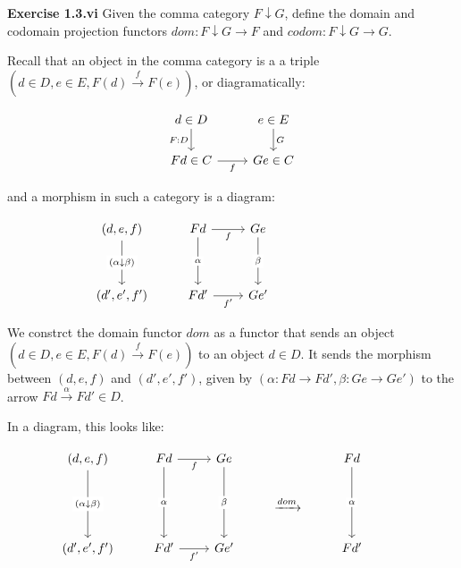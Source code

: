 \documentclass[11pt]{book}
\newcommand{\question}[1]{\textbf{#1}}
\newcommand{\comma}{\downarrow}
\begin{document}
\question{Exercise 1.3.vi} Given the comma category $F \downarrow G$, define the domain and codomain projection functors $dom: F \comma G \rightarrow F$
  and $codom: F \comma G \rightarrow G$.


Recall that an object in the comma category is a a triple $(d \in D, e \in E, F(d) \xrightarrow{f} F(e))$, or diagramatically:

\[\begin{tikzcd}
	{d \in D} & {e \in E} \\
	{Fd\in C} & {Ge \in C}
	\arrow["{F: D }"', from=1-1, to=2-1]
	\arrow["G", from=1-2, to=2-2]
	\arrow["f"', from=2-1, to=2-2]
\end{tikzcd}\]

and a morphism in such a category is a diagram:

\[\begin{tikzcd}
	{(d, e,f)} & Fd & Ge \\
	\\
	{(d', e',f')} & {Fd'} & {Ge'} &&& {}
	\arrow["{f'}"', from=3-2, to=3-3]
	\arrow["f"', from=1-2, to=1-3]
	\arrow["\alpha"{description}, from=1-2, to=3-2]
	\arrow["{\beta }"{description}, from=1-3, to=3-3]
	\arrow["{(\alpha \downarrow \beta)}"{description}, from=1-1, to=3-1]
\end{tikzcd}\]

We constrct the domain functor $dom$ as a functor that sends an object $(d \in D, e \in E, F(d) \xrightarrow{f} F(e))$ to an object $d \in D$.
It sends the morphism between $(d, e, f)$ and $(d', e', f')$, given by $(\alpha : Fd \rightarrow Fd', \beta: Ge \rightarrow Ge')$ to
the arrow $Fd \xrightarrow{\alpha} Fd' \in D$.

In a diagram, this looks like:

\[\begin{tikzcd}
	{(d, e,f)} & Fd & Ge && Fd \\
	&&& {\xrightarrow{dom}} \\
	{(d', e',f')} & {Fd'} & {Ge'} && {Fd'} & {}
	\arrow["{f'}"', from=3-2, to=3-3]
	\arrow["f"', from=1-2, to=1-3]
	\arrow["\alpha"{description}, from=1-2, to=3-2]
	\arrow["{\beta }"{description}, from=1-3, to=3-3]
	\arrow["{(\alpha \downarrow \beta)}"{description}, from=1-1, to=3-1]
	\arrow["\alpha"{description}, from=1-5, to=3-5]
\end{tikzcd}\]
\end{document}
